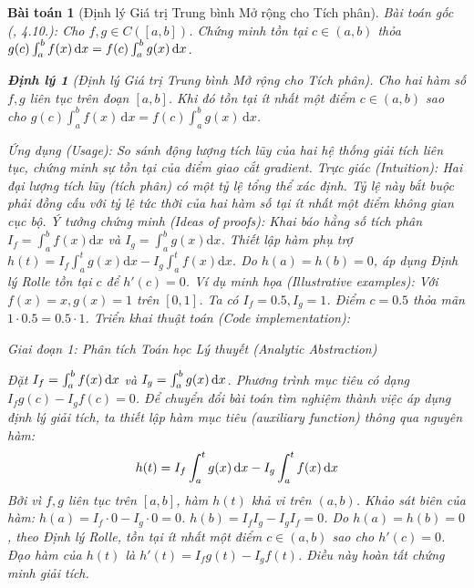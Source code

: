 \documentclass{article}
\newtheorem{baitoan}{Bài toán}
\newtheorem{dinhly}{Định lý}
\begin{document}
\begin{baitoan}[Định lý Giá trị Trung bình Mở rộng cho Tích phân]
 \emph{Bài toán gốc (\cite{Quoc_Long_Dat_Nam_VMC}, 4.10.):} 
 Cho $f,g\in C([a,b])$. Chứng minh tồn tại $c\in(a,b)$ thỏa $g(c)\int_a^b f(x)\,{\rm d}x = f(c)\int_a^b g(x)\,{\rm d}x$.

\begin{dinhly}[Định lý Giá trị Trung bình Mở rộng cho Tích phân]
Cho hai hàm số $f, g$ liên tục trên đoạn $[a, b]$. Khi đó tồn tại ít nhất một điểm $c \in (a, b)$ sao cho $g(c) \int_a^b f(x) \, \mathrm{d}x = f(c) \int_a^b g(x) \, \mathrm{d}x$.
\end{dinhly}
\emph{Ứng dụng (Usage):} So sánh động lượng tích lũy của hai hệ thống giải tích liên tục, chứng minh sự tồn tại của điểm giao cắt gradient.
\emph{Trực giác (Intuition):} Hai đại lượng tích lũy (tích phân) có một tỷ lệ tổng thể xác định. Tỷ lệ này bắt buộc phải đồng cấu với tỷ lệ tức thời của hai hàm số tại ít nhất một điểm không gian cục bộ.
\emph{Ý tưởng chứng minh (Ideas of proofs):} Khai báo hằng số tích phân $I_f = \int_a^b f(x)\mathrm{d}x$ và $I_g = \int_a^b g(x)\mathrm{d}x$. Thiết lập hàm phụ trợ $h(t) = I_f \int_a^t g(x)\mathrm{d}x - I_g \int_a^t f(x)\mathrm{d}x$. Do $h(a) = h(b) = 0$, áp dụng Định lý Rolle tồn tại $c$ để $h'(c) = 0$.
\emph{Ví dụ minh họa (Illustrative examples):} Với $f(x)=x, g(x)=1$ trên $[0, 1]$. Ta có $I_f = 0.5, I_g = 1$. Điểm $c = 0.5$ thỏa mãn $1 \cdot 0.5 = 0.5 \cdot 1$.
\emph{Triển khai thuật toán (Code implementation):}



\vspace{0.5em}\noindent\emph{Giai đoạn 1: Phân tích Toán học Lý thuyết (Analytic Abstraction)}
 
 Đặt $I_f = \int_a^b f(x)\,{\rm d}x$ và $I_g = \int_a^b g(x)\,{\rm d}x$. Phương trình mục tiêu có dạng $I_f g(c) - I_g f(c) = 0$. Để chuyển đổi bài toán tìm nghiệm thành việc áp dụng định lý giải tích, ta thiết lập hàm mục tiêu (auxiliary function) thông qua nguyên hàm:
 \begin{equation}
 h(t) = I_f \int_a^t g(x)\,{\rm d}x - I_g \int_a^t f(x)\,{\rm d}x
 \end{equation}
 Bởi vì $f, g$ liên tục trên $[a,b]$, hàm $h(t)$ khả vi trên $(a,b)$. Khảo sát biên của hàm:
 $h(a) = I_f \cdot 0 - I_g \cdot 0 = 0$.
 $h(b) = I_f I_g - I_g I_f = 0$.
 Do $h(a) = h(b) = 0$, theo Định lý Rolle, tồn tại ít nhất một điểm $c \in (a,b)$ sao cho $h'(c) = 0$. Đạo hàm của $h(t)$ là $h'(t) = I_f g(t) - I_g f(t)$. Điều này hoàn tất chứng minh giải tích.


\end{baitoan}
\end{document}
